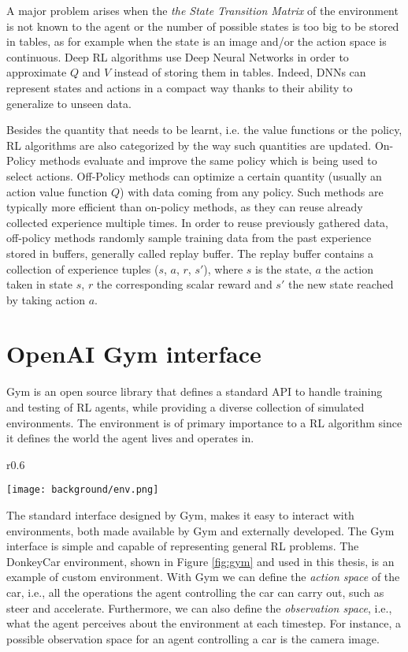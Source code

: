 A major problem arises when the \textit{the State Transition Matrix} of the environment is not known to the agent or the number of possible states is too big to be stored in tables, as for example when the state is an image and/or the action space is continuous. Deep RL algorithms use Deep Neural Networks in order to approximate $Q$ and $V$ instead of storing them in tables. Indeed, DNNs can represent states and actions in a compact way thanks to their ability to generalize to unseen data. 

Besides the quantity that needs to be learnt, i.e. the value functions or the policy, RL algorithms are also categorized by the way such quantities are updated. On-Policy methods evaluate and improve the same policy which is being used to select actions. Off-Policy methods can optimize a certain quantity (usually an action value function $Q$) with data coming from any policy. Such methods are typically more efficient than on-policy methods, as they can reuse already collected experience multiple times. In order to reuse previously gathered data, off-policy methods randomly sample training data from the past experience stored in buffers, generally called replay buffer. The replay buffer contains a collection of experience tuples ($s$, $a$, $r$, $s'$), where $s$ is the state, $a$ the action taken in state $s$, $r$ the corresponding scalar reward and $s'$ the new state reached by taking action $a$.

\section{OpenAI Gym interface}

Gym is an open source library that defines a standard API to handle training and testing of RL agents, while providing a diverse collection of simulated environments. The environment is of primary importance to a RL algorithm since it defines the world the agent lives and operates in. 

\begin{wrapfigure}{r}{0.6\textwidth}
  \begin{center}
    \texttt{[image: background/env.png]}
  \end{center}
  \caption{DonkeyCar environment}
  \label{fig:gym}
\end{wrapfigure}

The standard interface designed by Gym, makes it easy to interact with environments, both made available by Gym and externally developed. The Gym interface is simple and capable of representing general RL problems. The DonkeyCar environment, shown in Figure \ref{fig:gym} and used in this thesis, is an example of custom environment. With Gym we can define the \textit{ action space} of the car, i.e., all the operations the agent controlling the car can carry out, such as steer and accelerate. Furthermore, we can also define the \textit{observation space}, i.e., what the agent perceives about the environment at each timestep. For instance, a possible observation space for an agent controlling a car is the camera image.


